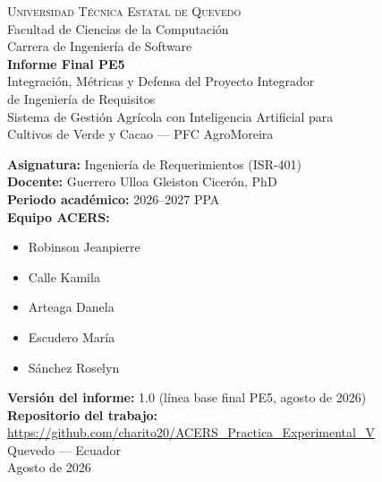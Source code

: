 \begin{titlepage}
\centering

{\large \textsc{Universidad T\'ecnica Estatal de Quevedo}}\\[0.3cm]
{\normalsize Facultad de Ciencias de la Computaci\'on}\\[0.1cm]
{\normalsize Carrera de Ingenier\'ia de Software}\\[2.2cm]

{\Large \textbf{Informe Final PE5}}\\[0.4cm]
{\large Integraci\'on, M\'etricas y Defensa del Proyecto Integrador\\[0.15cm]
de Ingenier\'ia de Requisitos}\\[1.6cm]

{\large Sistema de Gesti\'on Agr\'icola con Inteligencia Artificial para\\[0.1cm]
Cultivos de Verde y Cacao --- PFC AgroMoreira}\\[2.0cm]

\begin{flushleft}\hspace*{2.2cm}
\textbf{Asignatura:} Ingenier\'ia de Requerimientos (ISR-401)\\[0.15cm]
\textbf{Docente:} Guerrero Ulloa Gleiston Cicer\'on, PhD\\[0.15cm]
\textbf{Periodo acad\'emico:} 2026--2027 PPA\\[0.15cm]
\textbf{Equipo ACERS:}
\begin{itemize}[leftmargin=1.4cm, itemsep=0pt, topsep=2pt]
  \item Robinson Jeanpierre
  \item Calle Kamila
  \item Arteaga Danela
  \item Escudero Mar\'ia
  \item S\'anchez Roselyn
\end{itemize}
\end{flushleft}

\vfill

\textbf{Versi\'on del informe:} 1.0 (l\'inea base final PE5, agosto de 2026)\\[0.35cm]

\textbf{Repositorio del trabajo:} \url{https://github.com/charito20/ACERS_Practica_Experimental_V}\\[0.25cm]

\vspace{0.2cm}
Quevedo --- Ecuador\\[0.1cm]
Agosto de 2026
\end{titlepage}
